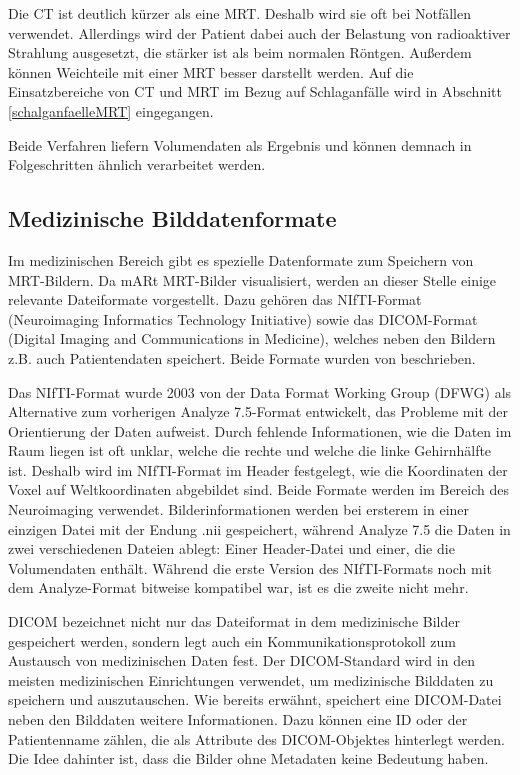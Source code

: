 Die CT ist deutlich kürzer als eine MRT. Deshalb wird sie oft bei Notfällen verwendet. Allerdings wird der Patient dabei auch der Belastung von radioaktiver Strahlung ausgesetzt, die stärker ist als beim normalen Röntgen. Außerdem können Weichteile mit einer MRT besser darstellt werden. \cite{ct2}
Auf die Einsatzbereiche von CT und MRT im Bezug auf Schlaganfälle wird in Abschnitt \ref{schalganfaelleMRT} eingegangen.

Beide Verfahren liefern Volumendaten als Ergebnis und können demnach in Folgeschritten ähnlich verarbeitet werden.

\subsection{Medizinische Bilddatenformate}
\label{datenformate}
 
Im medizinischen Bereich gibt es spezielle Datenformate zum Speichern von MRT-Bildern. Da mARt MRT-Bilder visualisiert, werden an dieser Stelle einige relevante Dateiformate vorgestellt. Dazu gehören das NIfTI-Format (Neuroimaging Informatics Technology Initiative) sowie das DICOM-Format (Digital Imaging and Communications in Medicine), welches neben den Bildern z.B. auch Patientendaten speichert. Beide Formate wurden von \cite{Larobina13} beschrieben.

Das NIfTI-Format wurde 2003 von der Data Format Working Group (DFWG) als Alternative zum vorherigen Analyze 7.5-Format entwickelt, das Probleme mit der Orientierung der Daten aufweist. Durch fehlende Informationen, wie die Daten im Raum liegen ist oft unklar, welche die rechte und welche die linke Gehirnhälfte ist. Deshalb wird im NIfTI-Format im Header festgelegt, wie die Koordinaten der Voxel auf Weltkoordinaten abgebildet sind. Beide Formate werden im Bereich des Neuroimaging verwendet.
Bilderinformationen werden bei ersterem in einer einzigen Datei mit der Endung .nii gespeichert, während Analyze 7.5 die Daten in zwei verschiedenen Dateien ablegt: Einer Header-Datei und einer, die die Volumendaten enthält. Während die erste Version des NIfTI-Formats noch mit dem Analyze-Format bitweise kompatibel war, ist es die zweite nicht mehr. 
 

DICOM bezeichnet nicht nur das Dateiformat in dem medizinische Bilder gespeichert werden, sondern  legt auch ein Kommunikationsprotokoll zum Austausch von medizinischen Daten fest. Der DICOM-Standard wird in den meisten medizinischen Einrichtungen verwendet, um medizinische Bilddaten zu speichern und auszutauschen.
Wie bereits erwähnt, speichert eine DICOM-Datei neben den Bilddaten weitere Informationen. Dazu können eine ID oder der Patientenname zählen, die als Attribute des DICOM-Objektes hinterlegt werden. Die Idee dahinter ist, dass die Bilder ohne Metadaten keine Bedeutung haben. 

